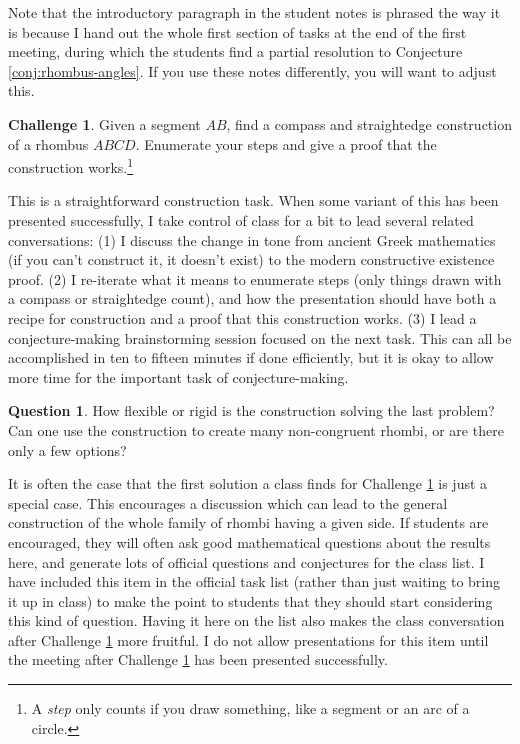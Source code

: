 \documentclass{tufte-handout}
\theoremstyle{definition}
\newtheorem{question}[problem]{Question}
\newtheorem{challenge}[problem]{Challenge}
\begin{document}
Note that the introductory paragraph in the student notes is phrased the way it is because I hand out the whole first section of tasks at the end of the first meeting, during which the students find a partial resolution to Conjecture \ref{conj:rhombus-angles}. If you use these notes differently, you will want to adjust this.


\begin{challenge}
\label{prob:rhombus-construct}
Given a segment $AB$, find a compass and straightedge construction of a rhombus $ABCD$.
Enumerate your steps and give a proof that the construction works.\footnote{A \emph{step} only counts if you draw something, like a segment or an arc of a circle.}
\end{challenge}

This is a straightforward construction task. When some variant of this has been presented successfully, I take control of class for a bit to lead several related conversations: 
(1) I discuss the change in tone from ancient Greek mathematics (if you can't construct it, it doesn't exist) to the modern constructive existence proof.
(2) I re-iterate what it means to enumerate steps (only things drawn with a compass or straightedge count), and how the presentation should have both a recipe for construction and a proof that this construction works.
(3) I lead a conjecture-making brainstorming session focused on the next task. 
This can all be accomplished in ten to fifteen minutes if done efficiently, but it is okay to allow more time for the important task of conjecture-making.

\begin{question}
\label{prob:rhombus-flexible}
How flexible or rigid is the construction solving the last problem?
Can one use the construction to create many non-congruent rhombi, or are there only a few options?
\end{question}

It is often the case that the first solution a class finds for Challenge \ref{prob:rhombus-construct} is just a special case.
This encourages a discussion which can lead to the general construction of the whole family of rhombi having a given side.
If students are encouraged, they will often ask good mathematical questions about the results here, and generate lots of official questions and conjectures for the class list. I have included this item in the official task list (rather than just waiting to bring it up in class) to make the point to students that they should start considering this kind of question. Having it here on the list also makes the class conversation after Challenge \ref{prob:rhombus-construct} more fruitful. I do not allow presentations for this item until the meeting after Challenge \ref{prob:rhombus-construct} has been presented successfully.
\end{document}
